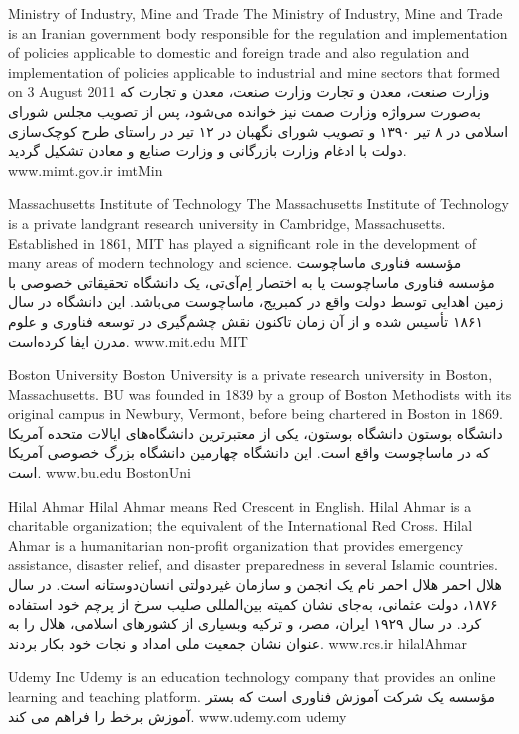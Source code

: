 
\instituteC
{Ministry of Industry, Mine and Trade}
{The Ministry of Industry, Mine and Trade is an Iranian government body responsible for the regulation and implementation of
policies applicable to domestic and foreign trade and also regulation and implementation of policies applicable to industrial
and mine sectors that formed on 3 August 2011}
{}
{وزارت صنعت، معدن و تجارت}
{وزارت صنعت، معدن و تجارت که به‌صورت سرواژه وزارت صمت نیز خوانده می‌شود،
پس از تصویب مجلس شورای اسلامی در ۸ تیر ۱۳۹۰ و تصویب شورای نگهبان در ۱۲ تیر
در راستای طرح کوچک‌سازی دولت با ادغام وزارت بازرگانی و وزارت صنایع و معادن تشکیل گردید.}
{}
{www.mimt.gov.ir}
{imtMin}

\instituteC
{Massachusetts Institute of Technology}
{The Massachusetts Institute of Technology is a private landgrant research university in Cambridge, Massachusetts.
Established in 1861, MIT has played a significant role in the development of many areas of modern technology and science.}
{}
{مؤسسه فناوری ماساچوست}
{مؤسسه فناوری ماساچوست یا به اختصار اِم‌آی‌تی، یک دانشگاه تحقیقاتی خصوصی با زمین اهدایی توسط دولت واقع در کمبریج، ماساچوست می‌باشد.
این دانشگاه در سال ۱۸۶۱ تأسیس شده و از آن زمان تاکنون نقش چشم‌گیری در توسعه فناوری و علوم مدرن ایفا کرده‌است.}
{}
{www.mit.edu}
{MIT}

\instituteC
{Boston University}
{Boston University is a private research university in Boston, Massachusetts.
BU was founded in 1839 by a group of Boston Methodists with its original campus
in Newbury, Vermont, before being chartered in Boston in 1869.}
{}
{دانشگاه بوستون}
{دانشگاه بوستون، یکی از معتبرترین دانشگاه‌های ایالات متحده آمریکا که در ماساچوست واقع است.
این دانشگاه چهارمین دانشگاه بزرگ خصوصی آمریکا است.}
{}
{www.bu.edu}
{BostonUni}

\instituteC
{Hilal Ahmar}
{Hilal Ahmar means Red Crescent in English. Hilal Ahmar is a charitable organization; the equivalent of the International Red Cross.
Hilal Ahmar is a humanitarian non-profit organization that provides emergency assistance, disaster relief, and disaster preparedness
in several Islamic countries.}
{}
{هلال احمر}
{هلال احمر نام یک انجمن و سازمان غیردولتی انسان‌دوستانه است. در سال ۱۸۷۶، دولت عثمانی، به‌جای نشان کمیته بین‌المللی صلیب سرخ از پرچم خود استفاده کرد.
در سال ۱۹۲۹ ایران، مصر، و ترکیه وبسیاری از کشورهای اسلامی، هلال را به عنوان نشان جمعیت ملی امداد و نجات خود بکار بردند.}
{}
{www.rcs.ir}
{hilalAhmar}

\instituteC
{Udemy Inc}
{Udemy is an education technology company that provides an online learning and teaching platform.}
{}
{مؤسسه }
{یک شرکت آموزش فناوری است که بستر آموزش برخط را فراهم می کند.}
{}
{www.udemy.com}
{udemy}
